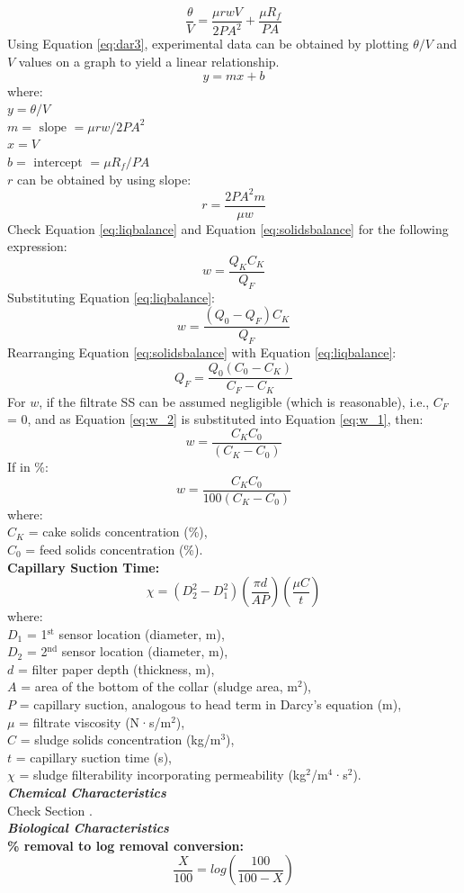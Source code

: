 \documentclass[a4paper, landscape, 8pt]{extarticle}
\begin{document}
\begin{multicols}{4}
\begin{equation}
    \frac{\theta}{V} = \frac{\mu rwV}{2 P A^2} + \frac{\mu R_f}{P A} \label{eq:dar3}
\end{equation}
Using Equation \ref{eq:dar3}, experimental data can be obtained by plotting $\theta/V$ and $V$ values on a graph to yield a linear relationship.
\[
y=mx+b
\]
where:\\
$y = \theta/V$\\
$m = \text{ slope } = \mu rw / 2 PA^2$\\
$x = V$\\
$b = \text{ intercept } = \mu R_f / PA$\\
$r$ can be obtained by using slope:
\[
r = \frac{2 P A^2 m}{\mu w}
\]
Check Equation \ref{eq:liqbalance} and Equation \ref{eq:solidsbalance} for the following expression:
\begin{equation}
    w = \frac{Q_KC_K}{Q_F} \label{eq:w_1}
\end{equation}
Substituting Equation \ref{eq:liqbalance}:
\[
w = \frac{(Q_0-Q_F)C_K}{Q_F}
\]
Rearranging Equation \ref{eq:solidsbalance} with Equation \ref{eq:liqbalance}:
\begin{equation}
    Q_F = \frac{Q_0(C_0-C_K)}{C_F-C_K} \label{eq:w_2}
\end{equation}
For $w$, if the filtrate SS can be assumed negligible (which is reasonable), i.e., $C_F$ = 0, and as Equation \ref{eq:w_2} is substituted into Equation \ref{eq:w_1}, then:
\[
w = \frac{C_KC_0}{(C_K-C_0)}
\]
If in \%:
\[
w = \frac{C_KC_0}{100(C_K-C_0)}
\]
where:\\
$C_K$ = cake solids concentration (\%),\\
$C_0$ = feed solids concentration (\%).\\
\textbf{Capillary Suction Time:}
\[
\chi = (D_2^2 - D_1^2)\left(\frac{\pi d}{ A P }\right)\left(\frac{\mu C}{t}\right)
\]
where:\\
$D_1$ = 1$^\text{st}$ sensor location (diameter, m),\\
$D_2$ = 2$^\text{nd}$ sensor location (diameter, m),\\
$d$ = filter paper depth (thickness, m),\\
$A$ = area of the bottom of the collar (sludge area, m$^2$),\\
$P$ = capillary suction, analogous to head term in Darcy's equation (m),\\
$\mu$ = filtrate viscosity (N·s/m$^2$),\\
$C$ = sludge solids concentration (kg/m$^3$),\\
$t$ = capillary suction time (s),\\
$\chi$ = sludge filterability incorporating permeability (kg$^2$/m$^4$·s$^2$).\\
\textbf{\textit{Chemical Characteristics}}\\
Check Section \textbf{}.\\
\textbf{\textit{Biological Characteristics}}\\
\textbf{\% removal to log removal conversion:}
\[
\frac{X}{100} = log\left(\frac{100}{100-X}\right)
\]

\end{multicols}
\end{document}
